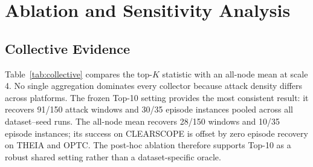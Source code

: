\documentclass[lettersize,journal]{IEEEtran}
\begin{document}
\section{Ablation and Sensitivity Analysis}
\label{sec:ablation}

\subsection{Collective Evidence}

Table~\ref{tab:collective} compares the top-$K$ statistic with an all-node mean
at scale 4.  No single aggregation dominates every collector because attack
density differs across platforms.  The frozen Top-10 setting provides the most
consistent result: it recovers 91/150 attack windows and 30/35 episode instances
pooled across all dataset--seed runs.  The all-node mean recovers 28/150 windows
and 10/35 episode instances; its success on CLEARSCOPE is offset by zero episode
recovery on THEIA and OPTC.  The post-hoc ablation therefore supports Top-10 as
a robust shared setting rather than a dataset-specific oracle.
\end{document}
